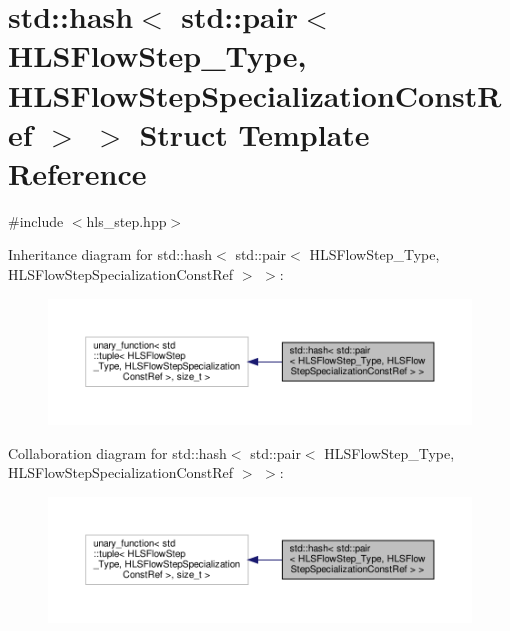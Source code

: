 \hypertarget{structstd_1_1hash_3_01std_1_1pair_3_01HLSFlowStep__Type_00_01HLSFlowStepSpecializationConstRef_01_4_01_4}{}\section{std\+:\+:hash$<$ std\+:\+:pair$<$ H\+L\+S\+Flow\+Step\+\_\+\+Type, H\+L\+S\+Flow\+Step\+Specialization\+Const\+Ref $>$ $>$ Struct Template Reference}
\label{structstd_1_1hash_3_01std_1_1pair_3_01HLSFlowStep__Type_00_01HLSFlowStepSpecializationConstRef_01_4_01_4}


{\ttfamily \#include $<$hls\+\_\+step.\+hpp$>$}



Inheritance diagram for std\+:\+:hash$<$ std\+:\+:pair$<$ H\+L\+S\+Flow\+Step\+\_\+\+Type, H\+L\+S\+Flow\+Step\+Specialization\+Const\+Ref $>$ $>$\+:
\nopagebreak
\begin{figure}[H]
\begin{center}
\leavevmode
\includegraphics[width=350pt]{dc/d69/structstd_1_1hash_3_01std_1_1pair_3_01HLSFlowStep__Type_00_01HLSFlowStepSpecializationConstRef_01_4_01_4__inherit__graph}
\end{center}
\end{figure}


Collaboration diagram for std\+:\+:hash$<$ std\+:\+:pair$<$ H\+L\+S\+Flow\+Step\+\_\+\+Type, H\+L\+S\+Flow\+Step\+Specialization\+Const\+Ref $>$ $>$\+:
\nopagebreak
\begin{figure}[H]
\begin{center}
\leavevmode
\includegraphics[width=350pt]{d5/d5c/structstd_1_1hash_3_01std_1_1pair_3_01HLSFlowStep__Type_00_01HLSFlowStepSpecializationConstRef_01_4_01_4__coll__graph}
\end{center}
\end{figure}
